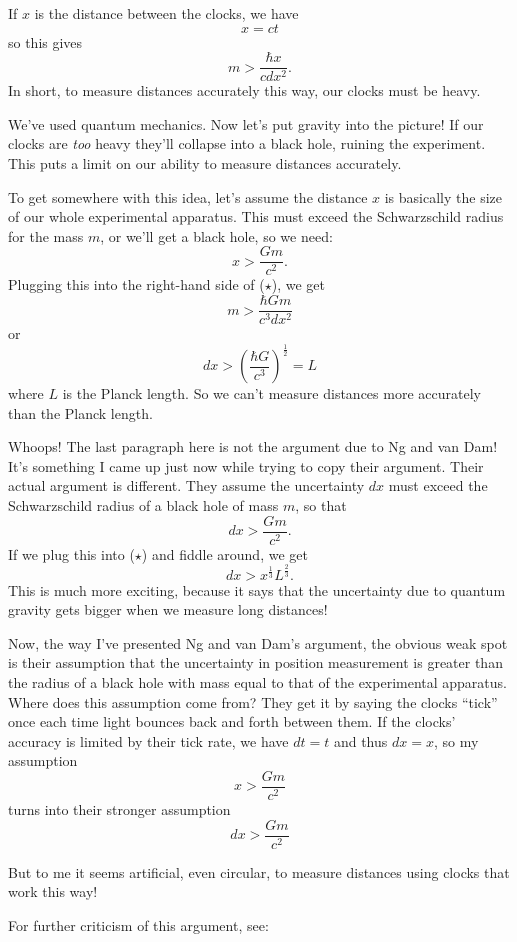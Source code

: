 \documentclass{article}
\def\tightlist{}
\renewcommand{\texttt}[1]{%
  \begingroup
  \ttfamily
  \begingroup\lccode`~=`/\lowercase{\endgroup\def~}{/\discretionary{}{}{}}%
  \begingroup\lccode`~=`[\lowercase{\endgroup\def~}{[\discretionary{}{}{}}%
  \begingroup\lccode`~=`.\lowercase{\endgroup\def~}{.\discretionary{}{}{}}%
  \catcode`/=\active\catcode`[=\active\catcode`.=\active
  \scantokens{#1\noexpand}%
  \endgroup
}
\begin{document}
If \(x\) is the distance between the clocks, we have \[x = c t\] so this
gives \[m > \frac{\hbar x}{c dx^2}.\tag{$\star$}\] In short, to measure
distances accurately this way, our clocks must be heavy.

We've used quantum mechanics. Now let's put gravity into the picture! If
our clocks are \emph{too} heavy they'll collapse into a black hole,
ruining the experiment. This puts a limit on our ability to measure
distances accurately.

To get somewhere with this idea, let's assume the distance \(x\) is
basically the size of our whole experimental apparatus. This must exceed
the Schwarzschild radius for the mass \(m\), or we'll get a black hole,
so we need: \[x > \frac{G m}{c^2}.\] Plugging this into the right-hand
side of (\(\star\)), we get \[m > \frac{\hbar G m}{c^3 dx^2}\] or
\[dx > \left(\frac{\hbar G}{c^3}\right)^{\frac12} = L\] where \(L\) is
the Planck length. So we can't measure distances more accurately than
the Planck length.

Whoops! The last paragraph here is not the argument due to Ng and van
Dam! It's something I came up just now while trying to copy their
argument. Their actual argument is different. They assume the
uncertainty \(dx\) must exceed the Schwarzschild radius of a black hole
of mass \(m\), so that \[dx > \frac{G m}{c^2}.\] If we plug this into
(\(\star\)) and fiddle around, we get \[dx > x^{\frac13} L^{\frac23}.\]
This is much more exciting, because it says that the uncertainty due to
quantum gravity gets bigger when we measure long distances!

Now, the way I've presented Ng and van Dam's argument, the obvious weak
spot is their assumption that the uncertainty in position measurement is
greater than the radius of a black hole with mass equal to that of the
experimental apparatus. Where does this assumption come from? They get
it by saying the clocks ``tick'' once each time light bounces back and
forth between them. If the clocks' accuracy is limited by their tick
rate, we have \(dt = t\) and thus \(dx = x\), so my assumption
\[x > \frac{G m}{c^2}\] turns into their stronger assumption
\[dx > \frac{G m}{c^2}\]

But to me it seems artificial, even circular, to measure distances using
clocks that work this way!

For further criticism of this argument, see:

\end{document}

